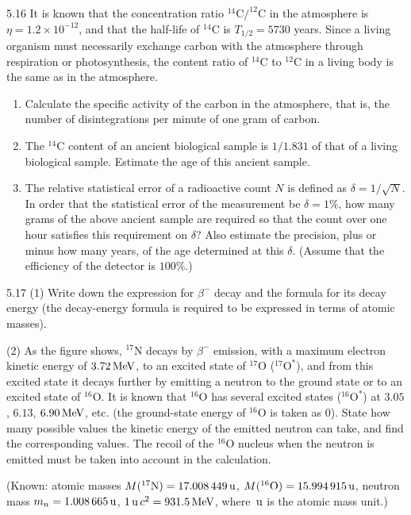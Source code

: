 \begin{problem}{5.16}
It is known that the concentration ratio $^{14}\mathrm{C}/^{12}\mathrm{C}$ in the atmosphere is $\eta = 1.2\times10^{-12}$, and that the half-life of $^{14}\mathrm{C}$ is $T_{1/2} = 5730$ years. Since a living organism must necessarily exchange carbon with the atmosphere through respiration or photosynthesis, the content ratio of $^{14}\mathrm{C}$ to $^{12}\mathrm{C}$ in a living body is the same as in the atmosphere.
\begin{enumerate}[label=(\arabic*),leftmargin=2.2em,itemsep=1pt,topsep=2pt]
\item Calculate the specific activity of the carbon in the atmosphere, that is, the number of disintegrations per minute of one gram of carbon.
\item The $^{14}\mathrm{C}$ content of an ancient biological sample is $1/1.831$ of that of a living biological sample. Estimate the age of this ancient sample.
\item The relative statistical error of a radioactive count $N$ is defined as $\delta = 1/\sqrt{N}$. In order that the statistical error of the measurement be $\delta = 1\%$, how many grams of the above ancient sample are required so that the count over one hour satisfies this requirement on $\delta$? Also estimate the precision, plus or minus how many years, of the age determined at this $\delta$. (Assume that the efficiency of the detector is $100\%$.)
\end{enumerate}
\end{problem}

\begin{problem}{5.17}
(1) Write down the expression for $\beta^-$ decay and the formula for its decay energy (the decay-energy formula is required to be expressed in terms of atomic masses).

(2) As the figure shows, $^{17}\mathrm{N}$ decays by $\beta^-$ emission, with a maximum electron kinetic energy of $3.72\,\mathrm{MeV}$, to an excited state of $^{17}\mathrm{O}$ ($^{17}\mathrm{O}^*$), and from this excited state it decays further by emitting a neutron to the ground state or to an excited state of $^{16}\mathrm{O}$. It is known that $^{16}\mathrm{O}$ has several excited states ($^{16}\mathrm{O}^*$) at $3.05$, $6.13$, $6.90\,\mathrm{MeV}$, etc. (the ground-state energy of $^{16}\mathrm{O}$ is taken as $0$). State how many possible values the kinetic energy of the emitted neutron can take, and find the corresponding values. The recoil of the $^{16}\mathrm{O}$ nucleus when the neutron is emitted must be taken into account in the calculation.

(Known: atomic masses $M(^{17}\mathrm{N}) = 17.008\,449\,\mathrm{u}$, $M(^{16}\mathrm{O}) = 15.994\,915\,\mathrm{u}$, neutron mass $m_n = 1.008\,665\,\mathrm{u}$, $1\,\mathrm{u}\,c^2 = 931.5\,\mathrm{MeV}$, where $\,\mathrm{u}$ is the atomic mass unit.)
\end{problem}

